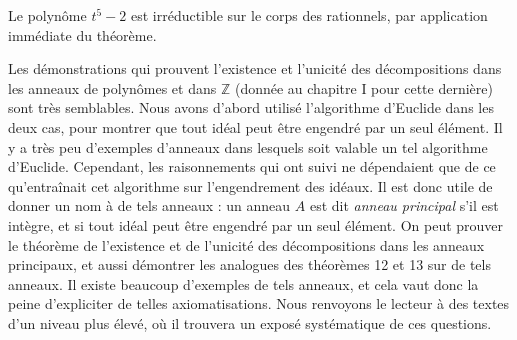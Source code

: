 \begin{exemple}
    Le polynôme \( t^5 - 2 \) est irréductible sur le corps des rationnels, par application immédiate du théorème.
\end{exemple}

\begin{remarque}
    Les démonstrations qui prouvent l’existence et l’unicité des décompositions dans les anneaux de polynômes et dans \( \mathbb{Z} \) (donnée au chapitre I pour cette dernière) sont très semblables. Nous avons d’abord utilisé l’algorithme d’Euclide dans les deux cas, pour montrer que tout idéal peut être engendré par un seul élément. Il y a très peu d’exemples d’anneaux dans lesquels soit valable un tel algorithme d’Euclide. Cependant, les raisonnements qui ont suivi ne dépendaient que de ce qu’entraînait cet algorithme sur l’engendrement des idéaux. Il est donc utile de donner un nom à de tels anneaux : un anneau \( A \) est dit \textit{anneau principal} s’il est intègre, et si tout idéal peut être engendré par un seul élément. On peut prouver le théorème de l’existence et de l’unicité des décompositions dans les anneaux principaux, et aussi démontrer les analogues des théorèmes 12 et 13 sur de tels anneaux. Il existe beaucoup d’exemples de tels anneaux, et cela vaut donc la peine d’expliciter de telles axiomatisations. Nous renvoyons le lecteur à des textes d’un niveau plus élevé, où il trouvera un exposé systématique de ces questions.
\end{remarque}

